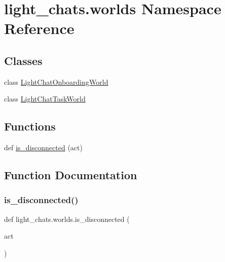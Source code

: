 \hypertarget{namespacelight__chats_1_1worlds}{}\section{light\+\_\+chats.\+worlds Namespace Reference}
\label{namespacelight__chats_1_1worlds}
\subsection*{Classes}
\begin{DoxyCompactItemize}
\item 
class \hyperlink{classlight__chats_1_1worlds_1_1LightChatOnboardingWorld}{Light\+Chat\+Onboarding\+World}
\item 
class \hyperlink{classlight__chats_1_1worlds_1_1LightChatTaskWorld}{Light\+Chat\+Task\+World}
\end{DoxyCompactItemize}
\subsection*{Functions}
\begin{DoxyCompactItemize}
\item 
def \hyperlink{namespacelight__chats_1_1worlds_a43b0aff73307cda95a089763b77f40d3}{is\+\_\+disconnected} (act)
\end{DoxyCompactItemize}


\subsection{Function Documentation}
\mbox{\label{namespacelight__chats_1_1worlds_a43b0aff73307cda95a089763b77f40d3}} 
\subsubsection{\texorpdfstring{is\+\_\+disconnected()}{is\_disconnected()}}
{\footnotesize\ttfamily def light\+\_\+chats.\+worlds.\+is\+\_\+disconnected (\begin{DoxyParamCaption}\item[{}]{act }\end{DoxyParamCaption})}


